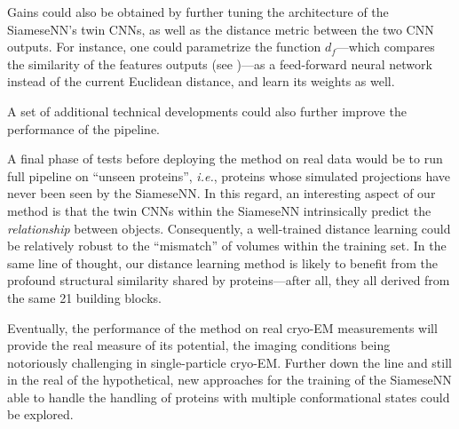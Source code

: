 Gains could also be obtained by further tuning the architecture of the SiameseNN's twin CNNs, as well as the distance metric between the two CNN outputs. For instance, one could parametrize the function $d_f$---which compares the similarity of the features outputs (see )---as a feed-forward neural network instead of the current Euclidean distance, and learn its weights as well.

A set of additional technical developments could also further improve the performance of the pipeline.  

A final phase of tests before deploying the method on real data would be to run full pipeline on ``unseen proteins'', \textit{i.e.}, proteins whose simulated projections have never been seen by the SiameseNN. 
In this regard, an interesting aspect of our method is that the twin CNNs within the SiameseNN intrinsically predict the \textit{relationship} between objects. 
Consequently, a well-trained distance learning could be relatively robust to the ``mismatch'' of volumes within the training set.
In the same line of thought, our distance learning method is likely to benefit from the profound structural similarity shared by proteins---after all, they all derived from the same 21 building blocks.

Eventually, the performance of the method on real cryo-EM measurements will provide the real measure of its potential, the imaging conditions being notoriously challenging in single-particle cryo-EM. Further down the line and still in the real of the hypothetical, new approaches for the training of the SiameseNN able to handle the handling of proteins with multiple conformational states could be explored. 

